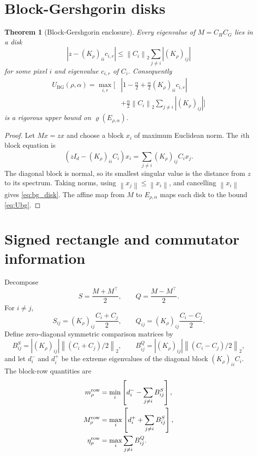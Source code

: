 \documentclass[11pt]{article}
\newtheorem{theorem}{Theorem}[section]
\newcommand{\norm}[1]{\left\lVert #1\right\rVert}
\newcommand{\spr}{\varrho}
\newcommand{\Ubg}{U_{\mathrm{BG}}}
\begin{document}
\section{Block-Gershgorin disks}\label{sec:gershgorin}
\begin{theorem}[Block-Gershgorin enclosure]\label{thm:gershgorin}
Every eigenvalue of $M=C_HC_G$ lies in a disk
\begin{equation}
\left|z-(K_\rho)_{ii}c_{i,r}\right|
\le \norm{C_i}_2\sum_{j\ne i}|(K_\rho)_{ij}|
\label{eq:bg_disk}
\end{equation}
for some pixel $i$ and eigenvalue $c_{i,r}$ of $C_i$. Consequently
\begin{equation}
\begin{aligned}
\Ubg(\rho,\alpha)=\max_{i,r}\Big[
&\left|1-\frac{\alpha}{2}
+\frac{\alpha}{2}(K_\rho)_{ii}c_{i,r}\right|\\
&+\frac{\alpha}{2}\norm{C_i}_2
\sum_{j\ne i}|(K_\rho)_{ij}|
\Big]
\end{aligned}
\label{eq:Ubg}
\end{equation}
is a rigorous upper bound on $\spr(E_{\rho,\alpha})$.
\end{theorem}
\begin{proof}
Let $Mx=zx$ and choose a block $x_i$ of maximum Euclidean norm. The $i$th
block equation is
\[
\left(zI_d-(K_\rho)_{ii}C_i\right)x_i
=\sum_{j\ne i}(K_\rho)_{ij}C_ix_j.
\]
The diagonal block is normal, so its smallest singular value is the distance
from $z$ to its spectrum. Taking norms, using
$\norm{x_j}\le\norm{x_i}$, and cancelling $\norm{x_i}$ gives
\eqref{eq:bg_disk}. The affine map from $M$ to $E_{\rho,\alpha}$ maps each disk
to the bound \eqref{eq:Ubg}.
\end{proof}

\section{Signed rectangle and commutator information}\label{sec:rectangle}
Decompose
\[
S=\frac{M+M^\top}{2},\qquad Q=\frac{M-M^\top}{2}.
\]
For $i\ne j$,
\[
S_{ij}=(K_\rho)_{ij}\frac{C_i+C_j}{2},\qquad
Q_{ij}=(K_\rho)_{ij}\frac{C_i-C_j}{2}.
\]
Define zero-diagonal symmetric comparison matrices by
\begin{equation}
B^S_{ij}=|(K_\rho)_{ij}|
\norm{(C_i+C_j)/2}_2,\qquad
B^Q_{ij}=|(K_\rho)_{ij}|
\norm{(C_i-C_j)/2}_2,
\label{eq:comparison_matrices}
\end{equation}
and let $d_i^-$ and $d_i^+$ be the extreme eigenvalues of the diagonal block
$(K_\rho)_{ii}C_i$. The block-row quantities are
\begin{align}
m_\rho^{\rm row}
&=\min_i\left[d_i^--\sum_{j\ne i}B^S_{ij}\right],\\
M_\rho^{\rm row}
&=\max_i\left[d_i^++\sum_{j\ne i}B^S_{ij}\right],\\
\eta_\rho^{\rm row}
&=\max_i\sum_{j\ne i}B^Q_{ij}.
\end{align}
\end{document}
